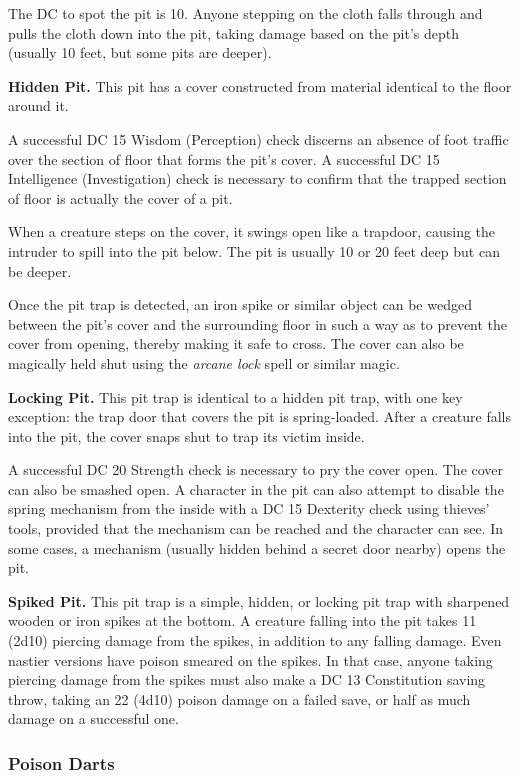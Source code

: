 \documentclass[
]{article}
\begin{document}
The DC to spot the pit is 10. Anyone stepping on the cloth falls through
and pulls the cloth down into the pit, taking damage based on the pit's
depth (usually 10 feet, but some pits are deeper).

\textbf{Hidden Pit.} This pit has a cover constructed from material
identical to the floor around it.

A successful DC 15 Wisdom (Perception) check discerns an absence of foot
traffic over the section of floor that forms the pit's cover. A
successful DC 15 Intelligence (Investigation) check is necessary to
confirm that the trapped section of floor is actually the cover of a
pit.

When a creature steps on the cover, it swings open like a trapdoor,
causing the intruder to spill into the pit below. The pit is usually 10
or 20 feet deep but can be deeper.

Once the pit trap is detected, an iron spike or similar object can be
wedged between the pit's cover and the surrounding floor in such a way
as to prevent the cover from opening, thereby making it safe to cross.
The cover can also be magically held shut using the \emph{arcane lock}
spell or similar magic.

\textbf{Locking Pit.} This pit trap is identical to a hidden pit trap,
with one key exception: the trap door that covers the pit is
spring-loaded. After a creature falls into the pit, the cover snaps shut
to trap its victim inside.

A successful DC 20 Strength check is necessary to pry the cover open.
The cover can also be smashed open. A character in the pit can also
attempt to disable the spring mechanism from the inside with a DC 15
Dexterity check using thieves' tools, provided that the mechanism can be
reached and the character can see. In some cases, a mechanism (usually
hidden behind a secret door nearby) opens the pit.

\textbf{Spiked Pit.} This pit trap is a simple, hidden, or locking pit
trap with sharpened wooden or iron spikes at the bottom. A creature
falling into the pit takes 11 (2d10) piercing damage from the spikes, in
addition to any falling damage. Even nastier versions have poison
smeared on the spikes. In that case, anyone taking piercing damage from
the spikes must also make a DC 13 Constitution saving throw, taking an
22 (4d10) poison damage on a failed save, or half as much damage on a
successful one.

\hypertarget{poison-darts}{%
\subsubsection{Poison Darts}\label{poison-darts}}
\end{document}
